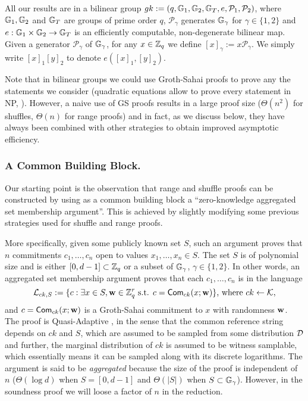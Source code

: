 All our results are in a bilinear group $gk:=(q,\mathbb{G}_1,\mathbb{G}_2,\mathbb{G}_T,e,\mathcal{P}_1,\mathcal{P}_2)$, where $\mathbb{G}_1,\mathbb{G}_2$
and $\mathbb{G}_T$ are groups of prime order $q$, $\mathcal{P}_\gamma$ generates  
$\mathbb{G}_\gamma$ for $\gamma \in \{1,2\}$ and $e:\mathbb{G}_1\times\mathbb{G}_2\to\mathbb{G}_T$ is an efficiently
computable, non-degenerate bilinear map. Given a generator $\mathcal{P}_\gamma$ of $\mathbb{G}_\gamma$, for any $x\in\mathbb{Z}_q$ we define $[x]_\gamma:=x\mathcal{P}_\gamma$. We simply write $[x]_1[y]_2$ to denote $e([x]_1,[y]_2)$.

Note that in bilinear groups we could use Groth-Sahai proofs to prove any the statements we consider (quadratic equations allow to prove every statement in NP, \cite{EC:GroOstSah06}).  However, a  naive use of GS proofs results in a large proof size ($\Theta(n^2)$ for shuffles, $\Theta(n)$ for range proofs) and in fact, as we discuss below, they have always been combined with other strategies to obtain improved asymptotic efficiency. 

\subsubsection{A Common Building Block.} Our starting point is the observation that range and shuffle proofs can be constructed by using as a common building block a 
``zero-knowledge aggregated set membership argument''. This is achieved by slightly modifying some previous strategies used for shuffle and range proofs.

More specifically,  given some publicly known set $S$, such an argument proves that $n$ commitments $c_1,\ldots,c_n$ open to values $x_1,\ldots,x_n \in S$.  The set $S$ is of polynomial size and is either $[0,d-1]\subset\mathbb{Z}_q$ or a subset of $\mathbb{G}_\gamma$, $\gamma \in \{1,2\}$.  
In other words, an aggregated set membership argument proves that each $c_1,\ldots,c_n$ is in the language
\begin{equation} \label{def:ckS}
\mathcal{L}_{ck,S}:=\{c: \exists x\in S, \mathbf{w}\in\mathbb{Z}_q^r \text{ s.t. } c=\mathsf{Com}_{ck}(x;\mathbf{w})\}\text{, where }ck\gets\mathcal{K},
\end{equation}
and $c=\mathsf{Com}_{ck}(x;\mathbf{w})$ is a Groth-Sahai commitment to $x$ with randomness $\mathbf{w}$. The proof is Quasi-Adaptive \cite{AC:JutRoy13}, in the sense that the common reference string depends on $ck$ and $S$, which are assumed to be sampled from some distribution $\mathcal{D}$
and further, the marginal distribution of $ck$ is assumed to be witness samplable, which essentially means it can be sampled along with its discrete logarithms. The argument is said to be \textit{aggregated} because the size of the proof is independent of $n$ ($\Theta(\log d)$ when $S=[0,d-1]$ and $\Theta(|S|)$ when $S\subset\mathbb{G}_\gamma$). However, in the soundness proof we will loose a factor of $n$ in the reduction. 


